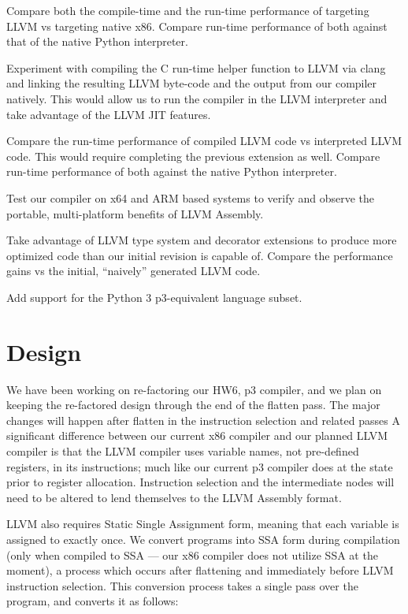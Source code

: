 \documentclass[11pt]{article}
\newenvironment{packed_item}{
\begin{itemize}
  \setlength{\itemsep}{1pt}
  \setlength{\parskip}{0pt}
  \setlength{\parsep}{0pt}
}{\end{itemize}}
\begin{document}
\begin{packed_item}
\item Compare both the compile-time and the run-time performance of
  targeting LLVM vs targeting native x86. Compare run-time performance
  of both against that of the native Python interpreter.
\item Experiment with compiling the C run-time helper function to LLVM
  via clang\cite{clang.llvm.org}
  and linking the resulting LLVM byte-code and the output
  from our compiler natively. This would allow us to run the compiler
  in the LLVM interpreter and take advantage of the LLVM JIT features.
\item Compare the run-time performance of compiled LLVM code vs
  interpreted LLVM code. This would require completing the previous
  extension as well. Compare run-time performance
  of both against the native Python interpreter.
\item Test our compiler on x64 and ARM based systems to verify and
  observe the portable, multi-platform benefits of LLVM Assembly.
\item Take advantage of LLVM type system and decorator extensions to
  produce more optimized code than our initial revision is capable of.
  Compare the performance gains vs the initial, ``naively'' generated
  LLVM code.
\item Add support for the Python 3 p3-equivalent language subset.
\end{packed_item}

\section{Design}

We have been working on re-factoring our HW6, p3 compiler, and we plan
on keeping the re-factored design through the end of the flatten
pass. The major changes will happen after flatten in the instruction
selection and related passes A significant difference between our
current x86 compiler and our planned LLVM compiler is that the LLVM
compiler uses variable names, not pre-defined registers, in its
instructions; much like our current p3 compiler does at the state
prior to register allocation. Instruction selection and the
intermediate nodes will need to be altered to lend themselves to the
LLVM Assembly format.

LLVM also requires Static Single Assignment form, meaning that each
variable is assigned to exactly once.  We convert programs into SSA
form during compilation (only when compiled to SSA --- our x86
compiler does not utilize SSA at the moment), a process which occurs
after flattening and immediately before LLVM instruction selection.
This conversion process takes a single pass over the program, and
converts it as follows:
\end{document}
